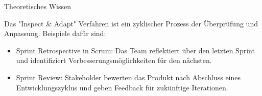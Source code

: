 \documentclass{article}
\begin{document}
\begin{exercise}{Theoretisches Wissen}
\begin{enumerate}
          \begin{solution}
            Das "Inspect \& Adapt" Verfahren ist ein zyklischer Prozess der Überprüfung und Anpassung. Beispiele dafür sind:
            \begin{itemize}
              \item Sprint Retrospective in Scrum: Das Team reflektiert über den letzten Sprint und identifiziert Verbesserungsmöglichkeiten für den nächsten.
              \item Sprint Review: Stakeholder bewerten das Produkt nach Abschluss eines Entwicklungszyklus und geben Feedback für zukünftige Iterationen.
            \end{itemize}
          \end{solution}
  \end{enumerate}
\end{exercise}
\end{document}

